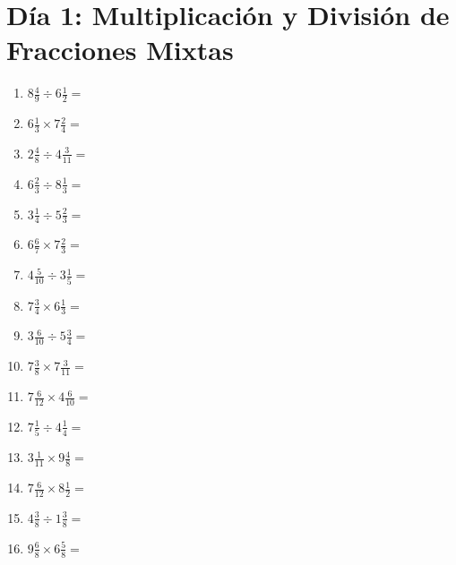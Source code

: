 \documentclass[12pt]{article}
\begin{document}
\section*{Día 1: Multiplicación y División de Fracciones Mixtas}
\begin{enumerate}
\item \large $ 8 \frac{4}{9} \div 6 \frac{1}{2} = $ \vspace{1.6cm}
\item \large $ 6 \frac{1}{3} \times 7 \frac{2}{4} = $ \vspace{1.6cm}
\item \large $ 2 \frac{4}{8} \div 4 \frac{3}{11} = $ \vspace{1.6cm}
\item \large $ 6 \frac{2}{3} \div 8 \frac{1}{3} = $ \vspace{1.6cm}
\item \large $ 3 \frac{1}{4} \div 5 \frac{2}{3} = $ \vspace{1.6cm}
\item \large $ 6 \frac{6}{7} \times 7 \frac{2}{3} = $ \vspace{1.6cm}
\item \large $ 4 \frac{5}{10} \div 3 \frac{1}{5} = $ \vspace{1.6cm}
\item \large $ 7 \frac{3}{4} \times 6 \frac{1}{3} = $ \vspace{1.6cm}
\item \large $ 3 \frac{6}{10} \div 5 \frac{3}{4} = $ \vspace{1.6cm}
\item \large $ 7 \frac{3}{8} \times 7 \frac{3}{11} = $ \vspace{1.6cm}
\newpage
\item \large $ 7 \frac{6}{12} \times 4 \frac{6}{10} = $ \vspace{1.6cm}
\item \large $ 7 \frac{1}{5} \div 4 \frac{1}{4} = $ \vspace{1.6cm}
\item \large $ 3 \frac{1}{11} \times 9 \frac{4}{8} = $ \vspace{1.6cm}
\item \large $ 7 \frac{6}{12} \times 8 \frac{1}{2} = $ \vspace{1.6cm}
\item \large $ 4 \frac{3}{8} \div 1 \frac{3}{8} = $ \vspace{1.6cm}
\item \large $ 9 \frac{6}{8} \times 6 \frac{5}{8} = $ \vspace{1.6cm}

\end{enumerate}
\end{document}
